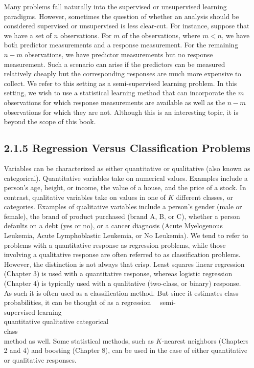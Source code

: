 \documentclass[10pt]{article}
\begin{document}
Many problems fall naturally into the supervised or unsupervised learning paradigms. However, sometimes the question of whether an analysis should be considered supervised or unsupervised is less clear-cut. For instance, suppose that we have a set of $n$ observations. For $m$ of the observations, where $m<n$, we have both predictor measurements and a response measurement. For the remaining $n-m$ observations, we have predictor measurements but no response measurement. Such a scenario can arise if the predictors can be measured relatively cheaply but the corresponding responses are much more expensive to collect. We refer to this setting as a semi-supervised learning problem. In this setting, we wish to use a statistical learning method that can incorporate the $m$ observations for which response measurements are available as well as the $n-m$ observations for which they are not. Although this is an interesting topic, it is beyond the scope of this book.

\subsection*{2.1.5 Regression Versus Classification Problems}
Variables can be characterized as either quantitative or qualitative (also known as categorical). Quantitative variables take on numerical values. Examples include a person's age, height, or income, the value of a house, and the price of a stock. In contrast, qualitative variables take on values in one of $K$ different classes, or categories. Examples of qualitative variables include a person's gender (male or female), the brand of product purchased (brand A, B, or C), whether a person defaults on a debt (yes or no), or a cancer diagnosis (Acute Myelogenous Leukemia, Acute Lymphoblastic Leukemia, or No Leukemia). We tend to refer to problems with a quantitative response as regression problems, while those involving a qualitative response are often referred to as classification problems. However, the distinction is not always that crisp. Least squares linear regression (Chapter 3) is used with a quantitative response, whereas logistic regression (Chapter 4) is typically used with a qualitative (two-class, or binary) response. As such it is often used as a classification method. But since it estimates class probabilities, it can be thought of as a regression\
\
semi-\\
supervised learning\\
quantitative qualitative categorical\\
class\\
method as well. Some statistical methods, such as $K$-nearest neighbors (Chapters 2 and 4) and boosting (Chapter 8), can be used in the case of either quantitative or qualitative responses.
\end{document}
